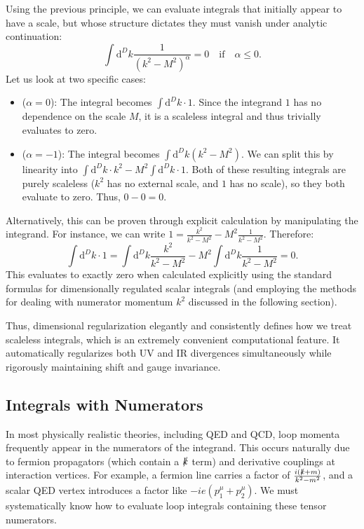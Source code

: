 \begin{example}
    Using the previous principle, we can evaluate integrals that initially appear to have a scale, but whose structure dictates they must vanish under analytic continuation:
    \[
        \int \mathrm{d}^D k \frac{1}{(k^2 - M^2)^{\alpha}} = 0 \quad \text{if} \quad \alpha \leq 0.
    \]
    Let us look at two specific cases:
    \begin{itemize}
        \item (\(\alpha = 0\)): The integral becomes $\int \mathrm{d}^D k \cdot 1$. Since the integrand $1$ has no dependence on the scale $M$, it is a scaleless integral and thus trivially evaluates to zero.
        \item (\(\alpha = -1\)): The integral becomes $\int \mathrm{d}^D k (k^2 - M^2)$. We can split this by linearity into $\int \mathrm{d}^D k \cdot k^2 - M^2 \int \mathrm{d}^D k \cdot 1$. Both of these resulting integrals are purely scaleless ($k^2$ has no external scale, and $1$ has no scale), so they both evaluate to zero. Thus, $0 - 0 = 0$.
    \end{itemize}
    Alternatively, this can be proven through explicit calculation by manipulating the integrand. For instance, we can write $1 = \frac{k^2}{k^2 - M^2} - M^2 \frac{1}{k^2 - M^2}$. Therefore:
    \[
        \int \mathrm{d}^D k \cdot 1 = \int \mathrm{d}^D k \frac{k^2}{k^2 - M^2} - M^2 \int \mathrm{d}^D k \frac{1}{k^2 - M^2} = 0.
    \]
    This evaluates to exactly zero when calculated explicitly using the standard formulas for dimensionally regulated scalar integrals (and employing the methods for dealing with numerator momentum $k^2$ discussed in the following section).
\end{example}
Thus, dimensional regularization elegantly and consistently defines how we treat scaleless integrals, which is an extremely convenient computational feature. It automatically regularizes both UV and IR divergences simultaneously while rigorously maintaining shift and gauge invariance.

\subsection{Integrals with Numerators}

In most physically realistic theories, including QED and QCD, loop momenta frequently appear in the numerators of the integrand. This occurs naturally due to fermion propagators (which contain a $\slashed{k}$ term) and derivative couplings at interaction vertices. For example, a fermion line carries a factor of $\frac{i(\slashed{k} + m)}{k^2 - m^2}$, and a scalar QED vertex introduces a factor like $-ie(p_1^\mu + p_2^\mu)$. We must systematically know how to evaluate loop integrals containing these tensor numerators.

